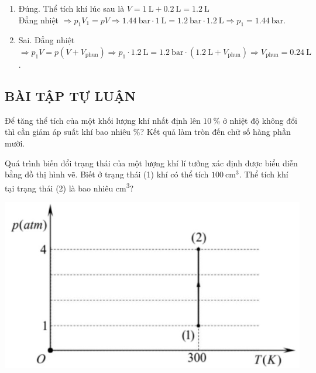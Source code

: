 \begin{ex}
{\begin{enumerate}[label=\alph*)]
		\item Đúng. Thể tích khí lúc sau là $V=\SI{1}{\liter}+\SI{0.2}{\liter}=\SI{1.2}{\liter}$\\
		Đẳng nhiệt $\Rightarrow p_1 V_1=p V \Rightarrow \SI{1.44}{\bar} \cdot \SI{1}{\liter}=\SI{1.2}{\bar} \cdot \SI{1.2}{\liter} \Rightarrow p_1=\SI{1.44}{\bar}$.
		\item Sai. Đẳng nhiệt $\Rightarrow p_1 V=p\left(V+V_{\text {phun}}\right) \Rightarrow p_1 \cdot \SI{1.2}{\liter}=\SI{1.2}{\bar} \cdot\left(\SI{1.2}{\liter}+V_{\text{phun}}\right) \Rightarrow V_{\text{phun}}=\SI{0.24}{\liter}$.
	\end{enumerate}
	}
\end{ex}
\subsection{BÀI TẬP TỰ LUẬN}
\setcounter{ex}{0}
\begin{ex}
	Để tăng thể tích của một khối lượng khí nhất định lên $\SI{10}{\percent}$ ở nhiệt độ không đổi thì cần giảm áp suất khí bao nhiêu $\si{\percent}$? Kết quả làm tròn đến chữ số hàng phần mười.
\end{ex}
\begin{ex}
	Quá trình biến đổi trạng thái của một lượng khí lí tưởng xác định được biểu diễn bằng đồ thị hình vẽ. Biết ở trạng thái (1) khí có thể tích $\SI{100}{\centi\meter^3}$. Thể tích khí tại trạng thái (2) là bao nhiêu \si{\centi\meter^3}?
\begin{center}
	\includegraphics[scale=0.5]{figs/VN12-Y24-PH-SYL-010P-1}
\end{center}
\end{ex}
